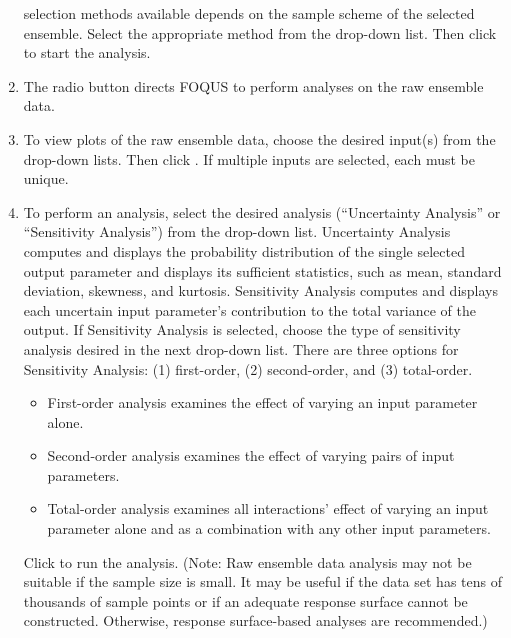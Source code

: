 \begin{enumerate}
	selection methods available depends on the sample scheme of the selected
	ensemble. Select the appropriate method from the  drop-down list. Then click  to
	start the analysis.
\item
	The  radio button directs FOQUS to perform analyses
	on the raw ensemble data.
\item
	To view plots of the raw ensemble data, choose the desired input(s) from
	the  drop-down lists. Then click .
   If multiple inputs are selected, each must be unique.
\item{To perform an analysis, select the desired analysis (``Uncertainty Analysis'' or
	``Sensitivity Analysis'') from the  drop-down list. Uncertainty
	Analysis computes and displays the probability distribution of the
	single selected output parameter and displays its sufficient statistics,
	such as mean, standard deviation, skewness, and kurtosis. Sensitivity Analysis computes and displays each uncertain input parameter's
	contribution to the total variance of the output. If Sensitivity Analysis is selected, choose the type of sensitivity analysis desired in the next drop-down list. There are three options for Sensitivity Analysis:
	(1) first-order, (2) second-order, and (3) total-order. 
	\begin{itemize}
		\item First-order analysis examines the effect of varying an input parameter alone.
		\item Second-order analysis examines the effect of varying pairs of input parameters.
		\item Total-order analysis examines all interactions' effect of
	         varying an input parameter alone and as a combination with any other
	         input parameters.
	\end{itemize}
	Click  to run the analysis. (Note: Raw ensemble data
	analysis may not be suitable if the sample size is small. It may be
	useful if the data set has tens of thousands of sample points or if an
	adequate response surface cannot be constructed. Otherwise, response
	surface-based analyses are recommended.)
   \begin{figure}[!htb]

\end{figure}}
\end{enumerate}

